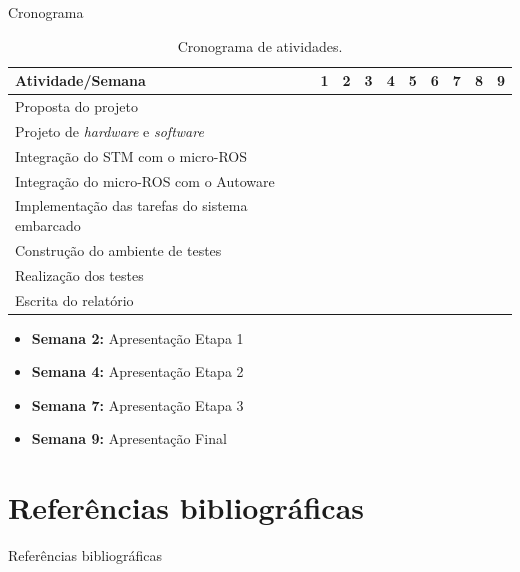\documentclass{if-beamer}
\begin{document}
\begin{frame}{Cronograma}
	
	
\begin{table}
	\centering
	\small{
		\begin{tabular}{|b|b|b|b|b|b|b|b|b|b|}
			\hline
			\textbf{Atividade/Semana} & 1 & \textbf{2} & 3 & \textbf{4} & 5 & 6 & \textbf{7} & 8 & \textbf{9} \\
			\hline
			Proposta do projeto  & \cellcolor{unifeiblue} &  &  &  &  &  &  &  &  \\
			\hline
			Projeto de \textit{hardware} e \textit{software}  &  & \cellcolor{unifeiblue} & \cellcolor{unifeiblue} &  &  &  &  &  &  \\
			\hline
			Integração do STM com o micro-ROS  &  & \cellcolor{unifeiblue} &  &  &  &  &  &  &  \\
			\hline
			Integração do micro-ROS com o Autoware  &  &  & \cellcolor{unifeiblue} & \cellcolor{unifeiblue} & \cellcolor{unifeiblue} &  &  &  &  \\
			\hline
			Implementação das tarefas do sistema embarcado  &  &  &  & \cellcolor{unifeiblue} & \cellcolor{unifeiblue} & \cellcolor{unifeiblue} & \cellcolor{unifeiblue} &  &  \\
			\hline
			Construção do ambiente de testes  &  &  &  &  & \cellcolor{unifeiblue} & \cellcolor{unifeiblue} & \cellcolor{unifeiblue} &  &  \\
			\hline
			Realização dos testes  &  &  &  &  &  &  & \cellcolor{unifeiblue} & \cellcolor{unifeiblue} & \cellcolor{unifeiblue} \\
			\hline
			Escrita do relatório  &   & \cellcolor{unifeiblue} & \cellcolor{unifeiblue} & \cellcolor{unifeiblue} & \cellcolor{unifeiblue} & \cellcolor{unifeiblue} & \cellcolor{unifeiblue} & \cellcolor{unifeiblue} & \cellcolor{unifeiblue} \\
			\hline
		\end{tabular}
	}
	\caption{Cronograma de atividades.}
	\label{tab:crono}
\end{table}
	
	\begin{itemize}
		\small
		\item \textbf{Semana 2:} Apresentação Etapa 1
		\item \textbf{Semana 4:} Apresentação Etapa 2
		\item \textbf{Semana 7:} Apresentação Etapa 3
		\item \textbf{Semana 9:} Apresentação Final
	\end{itemize}
	
\end{frame}


\section{Referências bibliográficas}
\begin{frame}{Referências bibliográficas}
   
\end{frame}
\end{document}
